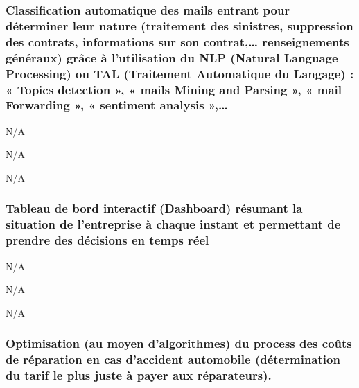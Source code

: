 \documentclass[]{article}
\begin{document}
\hypertarget{classification-automatique-des-mails-entrant-pour-duxe9terminer-leur-nature-traitement-des-sinistres-suppression-des-contrats-informations-sur-son-contrat-renseignements-guxe9nuxe9raux-gruxe2ce-uxe0-lutilisation-du-nlp-natural-language-processing-ou-tal-traitement-automatique-du-langage-topics-detection-mails-mining-and-parsing-mail-forwarding-sentiment-analysis}{%
\subsubsection{Classification automatique des mails entrant pour
déterminer leur nature (traitement des sinistres, suppression des
contrats, informations sur son contrat,\ldots{} renseignements généraux)
grâce à l'utilisation du NLP (Natural Language Processing) ou TAL
(Traitement Automatique du Langage) : « Topics detection », « mails
Mining and Parsing », « mail Forwarding », « sentiment analysis
»,\ldots{}}\label{classification-automatique-des-mails-entrant-pour-duxe9terminer-leur-nature-traitement-des-sinistres-suppression-des-contrats-informations-sur-son-contrat-renseignements-guxe9nuxe9raux-gruxe2ce-uxe0-lutilisation-du-nlp-natural-language-processing-ou-tal-traitement-automatique-du-langage-topics-detection-mails-mining-and-parsing-mail-forwarding-sentiment-analysis}}

N/A

N/A

N/A

\hypertarget{tableau-de-bord-interactif-dashboard-ruxe9sumant-la-situation-de-lentreprise-uxe0-chaque-instant-et-permettant-de-prendre-des-duxe9cisions-en-temps-ruxe9el}{%
\subsubsection{Tableau de bord interactif (Dashboard) résumant la
situation de l'entreprise à chaque instant et permettant de prendre des
décisions en temps
réel}\label{tableau-de-bord-interactif-dashboard-ruxe9sumant-la-situation-de-lentreprise-uxe0-chaque-instant-et-permettant-de-prendre-des-duxe9cisions-en-temps-ruxe9el}}

N/A

N/A

N/A

\hypertarget{optimisation-au-moyen-dalgorithmes-du-process-des-couxfbts-de-ruxe9paration-en-cas-daccident-automobile-duxe9termination-du-tarif-le-plus-juste-uxe0-payer-aux-ruxe9parateurs.}{%
\subsubsection{Optimisation (au moyen d'algorithmes) du process des
coûts de réparation en cas d'accident automobile (détermination du tarif
le plus juste à payer aux
réparateurs).}\label{optimisation-au-moyen-dalgorithmes-du-process-des-couxfbts-de-ruxe9paration-en-cas-daccident-automobile-duxe9termination-du-tarif-le-plus-juste-uxe0-payer-aux-ruxe9parateurs.}}
\end{document}
